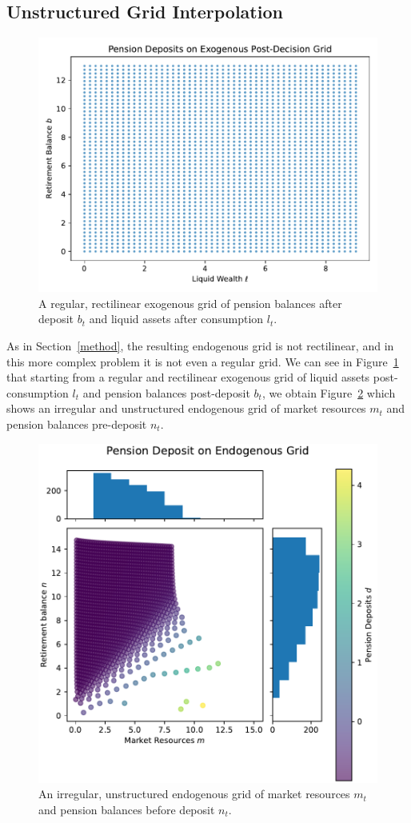 \documentclass{article}
\newcommand{\bRat}{b}
\newcommand{\mRat}{m}
\newcommand{\nRat}{n}
\newcommand{\lRat}{l}
\begin{document}
\subsection{Unstructured Grid Interpolation}\label{Unstructured Grid Interpolation}

\begin{figure}[!htbp]
\centering
\includegraphics[width=0.7\linewidth]{files/SparsePensionExogeno-93d871550cdf5782d7ec3fd8bc716e7a.pdf}
\caption{A regular, rectilinear exogenous grid of pension balances after deposit $\bRat_{t}$ and liquid assets after consumption $\lRat_{t}$.}
\label{fig:exog}
\end{figure}

As in Section~\ref{method}, the resulting endogenous grid is not rectilinear, and in this more complex problem it is not even a regular grid. We can see in  Figure~\ref{fig:exog} that starting from a regular and rectilinear exogenous grid of liquid assets post-consumption $\lRat_{t}$ and pension balances post-deposit $\bRat_{t}$, we obtain Figure~\ref{fig:endog} which shows an irregular and unstructured endogenous grid of market resources $\mRat_{t}$ and pension balances pre-deposit $\nRat_{t}$.

\begin{figure}[!htbp]
\centering
\includegraphics[width=0.7\linewidth]{files/PensionEndogenousGri-7f65683f98bfbf138cffb57b6fe7ff31.pdf}
\caption{An irregular, unstructured endogenous grid of market resources $\mRat_{t}$ and pension balances before deposit $\nRat_{t}$.}
\label{fig:endog}
\end{figure}
\end{document}
